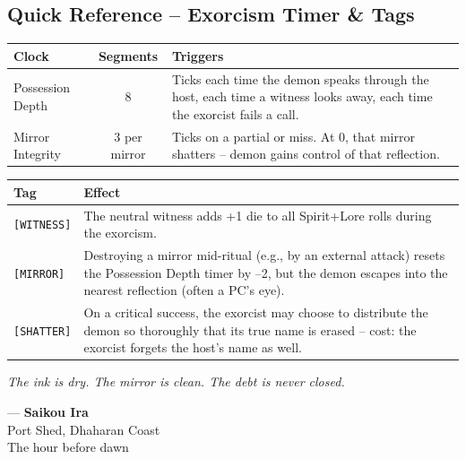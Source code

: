 \subsection{Quick Reference -- Exorcism Timer \& Tags}

\begin{center}
\begin{longtable}{p{4cm} c p{8cm}}
\toprule
\textbf{Clock} & \textbf{Segments} & \textbf{Triggers} \\
\midrule
Possession Depth & 8 & Ticks each time the demon speaks through the host, each time a witness looks away, each time the exorcist fails a call. \\
Mirror Integrity & 3 per mirror & Ticks on a partial or miss. At 0, that mirror shatters -- demon gains control of that reflection. \\
\bottomrule
\end{longtable}
\end{center}

\begin{center}
\begin{longtable}{p{2.5cm} p{10cm}}
\toprule
\textbf{Tag} & \textbf{Effect} \\
\midrule
\texttt{[WITNESS]} & The neutral witness adds +1 die to all Spirit+Lore rolls during the exorcism. \\
\texttt{[MIRROR]} & Destroying a mirror mid-ritual (e.g., by an external attack) resets the Possession Depth timer by --2, but the demon escapes into the nearest reflection (often a PC's eye). \\
\texttt{[SHATTER]} & On a critical success, the exorcist may choose to distribute the demon so thoroughly that its true name is erased -- cost: the exorcist forgets the host's name as well. \\
\bottomrule
\end{longtable}
\end{center}

\emph{The ink is dry. The mirror is clean. The debt is never closed.}

\vspace{0.5cm}
\noindent --- \textbf{Saikou Ira} \\
Port Shed, Dhaharan Coast \\
The hour before dawn